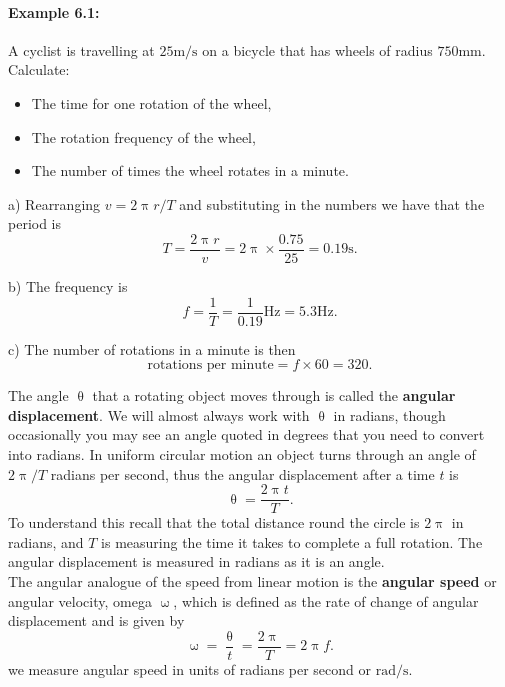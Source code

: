 \paragraph{Example 6.1:} A cyclist is travelling at $25\text{m/s}$ on a bicycle that has wheels of radius $750 \text{mm}$. Calculate:
\begin{itemize}
\setlength{\itemsep}{-5pt}
    \item[a)] The time for one rotation of the wheel,
    \item[b)] The rotation frequency of the wheel,
    \item[c)] The number of times the wheel rotates in a minute.
\end{itemize} 

a) Rearranging $v=2\uppi r/T$ and substituting in the numbers we have that the period is
\begin{equation*}
T=\frac{2\uppi r}{v}=2\uppi\times \frac{0.75}{25}=0.19\text{s}.
\end{equation*} 

b) The frequency is 
\begin{equation*}
f=\frac{1}{T}=\frac{1}{0.19}\text{Hz}=5.3\text{Hz}.
\end{equation*}

c) The number of rotations in a minute is then
\begin{equation*}
\text{rotations per minute} = f\times 60=320.
\end{equation*}

The angle $\uptheta$ that a rotating object moves through is called the \textbf{angular displacement}. We will almost always work with $\uptheta$ in radians, though occasionally you may see an angle quoted in degrees that you need to convert into radians. In uniform circular motion an object turns through an angle of $2\uppi/T$ radians per second, thus the angular displacement after a time $t$ is
\begin{equation}
\uptheta=\frac{2\uppi t}{T}.
\end{equation}
To understand this recall that the total distance round the circle is $2\uppi$ in radians, and $T$ is measuring the time it takes to complete a full rotation. The angular displacement is measured in radians as it is an angle. \\

The angular analogue of the speed from linear motion is the \textbf{angular speed} or angular velocity, omega  $\upomega$, which is defined as the rate of change of angular displacement and is given by
\begin{equation}
\upomega=\frac{\uptheta}{t}=\frac{2\uppi}{T}=2\uppi f.
\end{equation}
we measure angular speed in units of radians per second or $\text{rad/s}$. 

